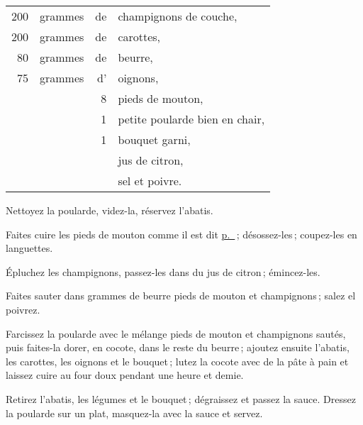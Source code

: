 \footnotesize
\begin{longtable}{rrrp{16em}}
    200 & grammes & de & champignons de couche,                                                           \\
    200 & grammes & de & carottes,                                                                        \\
     80 & grammes & de & beurre,                                                                          \\
     75 & grammes & d' & oignons,                                                                         \\
        &         &  8 & pieds de mouton,                                                                 \\
        &         &  1 & petite poularde bien en chair,                                                   \\
        &         &  1 & bouquet garni,                                                                   \\
        &         &    & jus de citron,                                                                   \\
        &         &    & sel et poivre.                                                                   \\
\end{longtable}
\normalsize

Nettoyez la poularde, videz-la, réservez l'abatis.

Faites cuire les pieds de mouton comme il est dit
\hyperlink{p0445}{p. \pageref{pg0445}} ; désossez-les ; coupez-les en languettes.

Épluchez les champignons, passez-les dans du jus de citron ; émincez-les.

Faites sauter dans {\mmm} grammes de beurre pieds de mouton et champignons ; salez
el poivrez.

Farcissez la poularde avec le mélange pieds de mouton et champignons sautés,
puis faites-la dorer, en cocote, dans le reste du beurre ; ajoutez ensuite
l'abatis, les carottes, les oignons et le bouquet ; lutez la cocote avec de la
pâte à pain et laissez cuire au four doux pendant une heure et demie.

Retirez l'abatis, les légumes et le bouquet ; dégraissez et passez la sauce.
Dressez la poularde sur un plat, masquez-la avec la sauce et servez.

